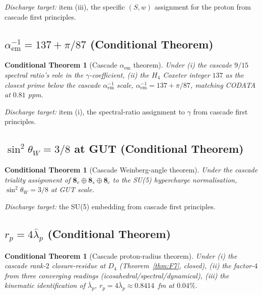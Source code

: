 \documentclass[11pt]{article}
\theoremstyle{plain}
\newtheorem{conditional}[theorem]{Conditional Theorem}
\theoremstyle{definition}
\theoremstyle{remark}
\begin{document}
\emph{Discharge target:} item (iii), the specific $(S, w)$ assignment for the proton from cascade first principles.

\subsection{$\alpha_\mathrm{em}^{-1} = 137 + \pi/87$ (Conditional Theorem)}\label{sec:matter-alpha}

\begin{conditional}[Cascade $\alpha_\mathrm{em}$ theorem]\label{cthm:alpha}
Under (i) the cascade $9/15$ spectral ratio's role in the $\gamma$-coefficient, (ii) the $H_4$ Coxeter integer $137$ as the closest prime below the cascade $\alpha_\mathrm{em}^{-1}$ scale, $\alpha_\mathrm{em}^{-1} = 137 + \pi/87$, matching CODATA at $0.81$ ppm.
\end{conditional}

\emph{Discharge target:} item (i), the spectral-ratio assignment to $\gamma$ from cascade first principles.

\subsection{$\sin^2\theta_W = 3/8$ at GUT (Conditional Theorem)}\label{sec:matter-sintheta}

\begin{conditional}[Cascade Weinberg-angle theorem]\label{cthm:sintheta}
Under the cascade triality assignment of $\mathbf{8}_v \oplus \mathbf{8}_s \oplus \mathbf{8}_c$ to the SU(5) hypercharge normalisation, $\sin^2\theta_W = 3/8$ at GUT scale.
\end{conditional}

\emph{Discharge target:} the SU(5) embedding from cascade first principles.

\subsection{$r_p = 4 \bar\lambda_p$ (Conditional Theorem)}\label{sec:matter-rp}

\begin{conditional}[Cascade proton-radius theorem]\label{cthm:rp}
Under (i) the cascade rank-$2$ closure-residue at $D_4$ (Theorem~\ref{thm:F7}, closed), (ii) the factor-$4$ from three converging readings (icosahedral/spectral/dynamical), (iii) the kinematic identification of $\bar\lambda_p$, $r_p = 4 \bar\lambda_p \approx 0.8414$~fm at $0.04\%$.
\end{conditional}
\end{document}
